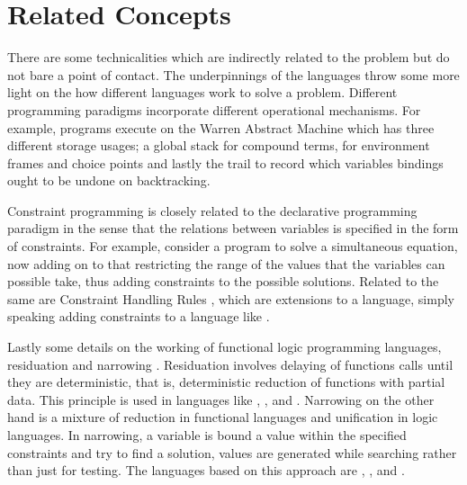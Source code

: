 \documentclass[proposal.tex]{subfiles}
\begin{document}
\chapter{Related Concepts}\label{chap:relatedWork}


There are some technicalities which are indirectly related to the problem but do not bare a point of contact. The underpinnings of the 
languages throw some more light on the how different languages work to solve a problem. Different programming paradigms incorporate 
different operational mechanisms. For example,  programs execute on the Warren Abstract Machine \cite{ait1999warren} which 
has three different storage usages; a global stack for compound terms, for environment frames and choice points and lastly the trail to 
record which variables bindings ought to be undone on backtracking.        

\par Constraint programming \cite{website:constraintprogwiki} is closely related to the declarative programming paradigm in the sense that 
the relations between variables is specified in the form of constraints. For example, consider a program to solve a simultaneous equation, 
now adding on to that restricting the range of the values that the variables can possible take, thus adding constraints to the possible 
solutions. Related to the same are Constraint Handling Rules \cite{website:chrwiki}, which are extensions to a language, simply speaking 
adding constraints to a language like .  

\par Lastly some details on the working of functional logic programming languages, residuation and narrowing 
\cite{hanus1995curry,webiste:wikicurry}. Residuation involves delaying of functions calls until they are deterministic, that is, 
deterministic reduction of functions with partial data. This principle is used in languages like  
\cite{lloyd1999programming:escher},  \cite{website:life},  
\cite{website:nue-prolog} and  \cite{website:oz-mozart}. Narrowing on the other hand is a mixture of reduction in functional 
languages and unification in logic languages. In narrowing, a variable is bound a value within the specified constraints and try to find a 
solution, values are generated while searching rather than just for testing. The languages based on this approach are  
\cite{website:alf},  \cite{website:babel},  \cite{bert1987lpg} and  \cite{website:curry}.   
\end{document}
